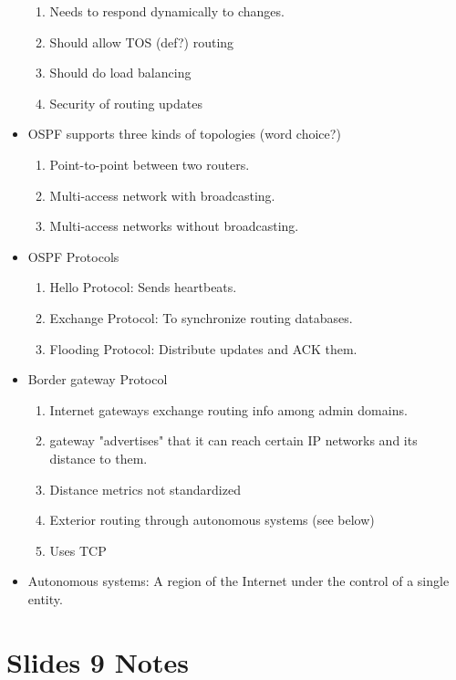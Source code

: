 \documentclass{scrartcl}
\begin{document}
\begin{itemize}
\begin{enumerate}
\item Needs to respond dynamically to changes.
\item Should allow TOS (def?) routing
\item Should do load balancing
\item Security of routing updates
\end{enumerate}
\item OSPF supports three kinds of topologies (word choice?)
\begin{enumerate}
\item Point-to-point between two routers.
\item Multi-access network with broadcasting.
\item Multi-access networks without broadcasting.
\end{enumerate}
\item OSPF Protocols
\begin{enumerate}
\item Hello Protocol: Sends heartbeats.
\item Exchange Protocol: To synchronize routing databases.
\item Flooding Protocol: Distribute updates and ACK them.
\end{enumerate}
\item Border gateway Protocol
\begin{enumerate}
\item Internet gateways exchange routing info among admin domains.
\item gateway "advertises" that it can reach certain IP networks and its
distance to them.
\item Distance metrics not standardized
\item Exterior routing through autonomous systems (see below)
\item Uses TCP
\end{enumerate}
\item Autonomous systems: A region of the Internet under the control of a
single entity.
\end{itemize}
\section*{Slides 9 Notes}
\end{document}
